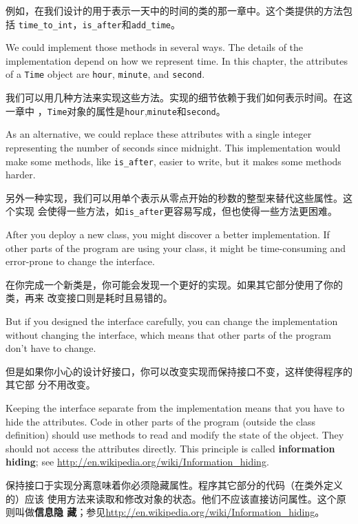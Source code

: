 \documentclass[10pt]{book}
\begin{document}
\begin{CJK}{UTF8}{gbsn}
例如，在我们设计的用于表示一天中的时间的类的那一章中。这个类提供的方法包括
\verb"time_to_int"，\verb"is_after"和\verb"add_time"。

We could implement those methods in several ways.  The details of the
implementation depend on how we represent time.  In this chapter, the
attributes of a {\tt Time} object are {\tt hour}, {\tt minute}, and
{\tt second}.

我们可以用几种方法来实现这些方法。实现的细节依赖于我们如何表示时间。在这一章中
，{\tt Time}对象的属性是{\tt hour},{\tt minute}和{\tt second}。

As an alternative, we could replace these attributes with
a single integer representing the number of seconds
since midnight.  This implementation would make some methods,
like \verb"is_after", easier to write, but it makes some methods
harder.

另外一种实现，我们可以用单个表示从零点开始的秒数的整型来替代这些属性。这个实现
会使得一些方法，如\verb"is_after"更容易写成，但也使得一些方法更困难。

After you deploy a new class, you might discover a better
implementation.  If other parts of the program are using your
class, it might be time-consuming and error-prone to change the
interface.  

在你完成一个新类是，你可能会发现一个更好的实现。如果其它部分使用了你的类，再来
改变接口则是耗时且易错的。

But if you designed the interface carefully, you can
change the implementation without changing the interface, which
means that other parts of the program don't have to change.

但是如果你小心的设计好接口，你可以改变实现而保持接口不变，这样使得程序的其它部
分不用改变。

Keeping the interface separate from the implementation means that
you have to hide the attributes.  Code in other parts of the program
(outside the class definition) should use methods to read
and modify the state of the object.  They should not access the
attributes directly.  This principle is called {\bf information hiding};
see \url{http://en.wikipedia.org/wiki/Information_hiding}.

保持接口于实现分离意味着你必须隐藏属性。程序其它部分的代码（在类外定义的）应该
使用方法来读取和修改对象的状态。他们不应该直接访问属性。这个原则叫做{\bf 信息隐
藏}；参见\url{http://en.wikipedia.org/wiki/Information_hiding}。


\begin{exercise}


\end{exercise}
\end{CJK}
\end{document}
